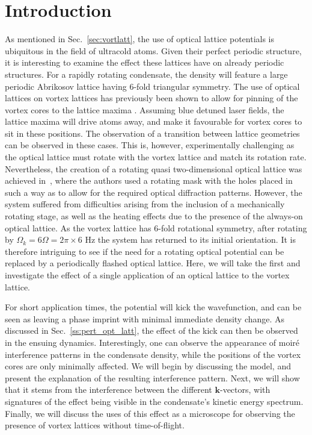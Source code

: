 \section{Introduction}

As mentioned in Sec.~\ref{sec:vortlatt}, the use of optical lattice potentials is ubiquitous in the field of ultracold atoms. Given their perfect periodic structure, it is interesting to examine the effect these lattices have on already periodic structures. For a rapidly rotating condensate, the density will feature a large periodic Abrikosov lattice having $6$-fold triangular symmetry. The use of optical lattices on vortex lattices has previously been shown to allow for pinning of the vortex cores to the lattice maxima \cite{OL:Reijnders_prl_2004,Vtx:Tung_prl_2006}. Assuming blue detuned laser fields, the lattice maxima will drive atoms away, and make it favourable for vortex cores to sit in these positions. The observation of a transition between lattice geometries can be observed in these cases. This is, however, experimentally challenging as the optical lattice must rotate with the vortex lattice and match its rotation rate. Nevertheless, the creation of a rotating quasi two-dimensional optical lattice was achieved in~\cite{Vtx:Tung_prl_2006}, where the authors used a rotating mask with the holes placed in such a way as to allow for the required optical diffraction patterns. However, the system suffered from difficulties arising from the inclusion of a mechanically rotating stage, as well as the heating effects due to the presence of the always-on optical lattice. As the vortex lattice has 6-fold rotational symmetry, after rotating by
$\Omega_{k}=6\Omega=2\pi\times 6$ Hz the system has returned to its initial orientation. It is therefore intriguing to see if the need for a rotating optical potential can be replaced by a periodically flashed optical lattice. Here, we will take the first and investigate the effect of a single application of an optical lattice to the vortex lattice.

 For short application times, the potential will kick the wavefunction, and can be seen as leaving a phase imprint with minimal immediate density change. As discussed in Sec.~\ref{ss:pert_opt_latt}, the effect of the kick can then be observed in the ensuing dynamics. Interestingly, one can observe the appearance of moir\'e interference patterns in the condensate density, while the positions of the vortex cores are only minimally affected. We will begin by discussing the model, and present the explanation of the resulting interference pattern. Next, we will show that it stems from the interference between the different $\mathbf{k}$-vectors, with signatures of the effect being visible in the condensate's kinetic energy spectrum. Finally, we will discuss the uses of this effect as a microscope for observing the presence of vortex lattices without time-of-flight.

